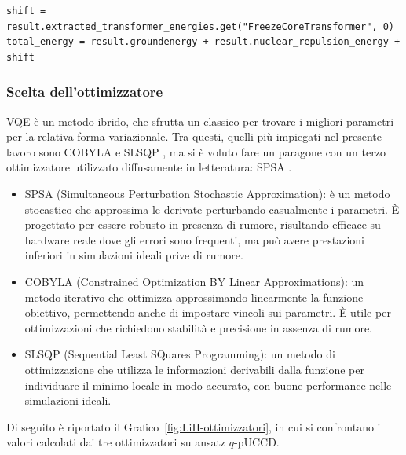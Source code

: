 \begin{tcolorbox}[title=Estrazione risultati]
\begin{lstlisting}
shift = result.extracted_transformer_energies.get("FreezeCoreTransformer", 0)
total_energy = result.groundenergy + result.nuclear_repulsion_energy + shift
\end{lstlisting}
\vspace{-0.2cm}
\end{tcolorbox}

\subsubsection{Scelta dell'ottimizzatore}

VQE è un metodo ibrido, che sfrutta un  classico per trovare i migliori parametri per la relativa forma variazionale. Tra questi, quelli più impiegati nel presente lavoro sono COBYLA \cite{powell_2007} e SLSQP \cite{kraft_1988}, ma si è voluto fare un paragone con un terzo ottimizzatore utilizzato diffusamente in letteratura: SPSA \cite{spsa_site}.

\begin{itemize}
    \item {SPSA} (Simultaneous Perturbation Stochastic Approximation): è un metodo stocastico che approssima le derivate perturbando casualmente i parametri. È progettato per essere robusto in presenza di rumore, risultando efficace su hardware reale dove gli errori sono frequenti, ma può avere prestazioni inferiori in simulazioni ideali prive di rumore.
    \item {COBYLA} (Constrained Optimization BY Linear Approximations): un metodo iterativo che ottimizza approssimando linearmente la funzione obiettivo, permettendo anche di impostare vincoli sui parametri. È utile per ottimizzazioni che richiedono stabilità e precisione in assenza di rumore.
    \item {SLSQP} (Sequential Least SQuares Programming): un metodo di ottimizzazione che utilizza le informazioni derivabili dalla funzione per individuare il minimo locale in modo accurato, con buone performance nelle simulazioni ideali.
\end{itemize}

Di seguito è riportato il Grafico~\ref{fig:LiH-ottimizzatori}, in cui si confrontano i valori calcolati dai tre ottimizzatori su ansatz $q$-pUCCD.

